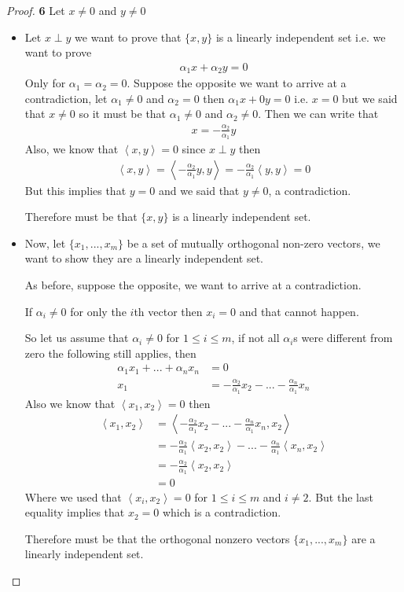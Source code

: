 \documentclass[11pt]{article}
\newcommand{\inprd}[1]{\left\langle{#1}\right\rangle}
\theoremstyle{definition}
\begin{document}
\cleardoublepage
\begin{proof}{\textbf{6}}
Let $x \neq 0$ and $y \neq 0$
\begin{itemize}
\item [(a)] Let $x \perp y$ we want to prove that $\{x,y\}$ is a linearly
independent set i.e. we want to prove
\begin{align*}
    \alpha_1 x + \alpha_2 y = 0
\end{align*}
Only for $\alpha_1 = \alpha_2 = 0$.
Suppose the opposite we want to arrive at a contradiction, let
$\alpha_1 \neq 0$ and $\alpha_2 = 0$ then $\alpha_1 x + 0 y= 0$ i.e.
$x = 0$ but we said that $x \neq 0$ so it must be that $\alpha_1 \neq 0$
and $\alpha_2 \neq 0$. Then we can write that
\begin{align*}
    x = -\frac{\alpha_2}{\alpha_1} y
\end{align*}
Also, we know that $\inprd{x,y} = 0$ since $x \perp y$ then
\begin{align*}
    \inprd{x,y} = \inprd{-\frac{\alpha_2}{\alpha_1} y, y}
    = -\frac{\alpha_2}{\alpha_1}\inprd{y,y} = 0
\end{align*}
But this implies that $y = 0$ and we said that $y \neq 0$, a contradiction.

Therefore must be that $\{x,y\}$ is a linearly independent set.

\item [(b)] Now, let $\{x_1, ..., x_m\}$ be a set of mutually orthogonal
non-zero vectors, we want to show they are a linearly independent set.

As before, suppose the opposite, we want to arrive at a contradiction.

If $\alpha_i \neq 0$ for only the $i$th vector then $x_i = 0$ and that
cannot happen.

So let us assume that $\alpha_i \neq 0$ for $1 \leq i \leq m$, if not all
$\alpha_i$s were different from zero the following still applies, then 
\begin{align*}
    \alpha_1 x_1 + ... + \alpha_n x_n &= 0\\
    x_1 &= -\frac{\alpha_2}{\alpha_1} x_2 - ... - \frac{\alpha_n}{\alpha_1} x_n
\end{align*}
Also we know that $\inprd{x_1, x_2} = 0$ then
\begin{align*}
    \inprd{x_1, x_2}
    &= \inprd{-\frac{\alpha_2}{\alpha_1} x_2 - ...
    - \frac{\alpha_n}{\alpha_1} x_n, x_2}\\
    &= -\frac{\alpha_2}{\alpha_1} \inprd{x_2, x_2} - ...
    - \frac{\alpha_n}{\alpha_1}\inprd{x_n, x_2}\\
    &= -\frac{\alpha_2}{\alpha_1} \inprd{x_2, x_2}\\
    &= 0
\end{align*}
Where we used that $\inprd{x_i, x_2} = 0$ for $1 \leq i \leq m$ and
$i \neq 2$.
But the last equality implies that $x_2 = 0$ which is a contradiction.

Therefore must be that the orthogonal nonzero vectors $\{x_1, ..., x_m\}$
are a linearly independent set.
\end{itemize}
\end{proof}
\end{document}
